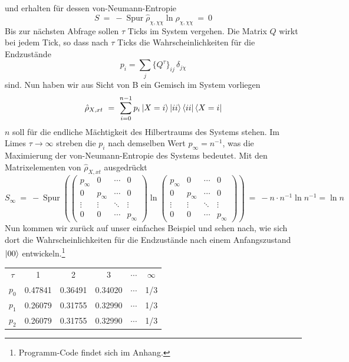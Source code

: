 \documentclass[12pt]{article}
\begin{document}
und erhalten für dessen von-Neumann-Entropie
\begin{equation}
S\ =\ -\operatorname{Spur} \hat{\rho}_{\chi,\chi\chi} \ln \hat{\rho}_{\chi,\chi\chi}\ = \ 0
\end{equation}
Bis zur nächsten Abfrage sollen $\tau$ Ticks im System vergehen. Die Matrix $Q$ wirkt bei jedem Tick, so dass nach $\tau$ Ticks die Wahrscheinlichkeiten für die Endzustände
\begin{equation}
p_i=\sum_j \{Q^\tau\}_{ij}\, \delta_{j\chi}
\end{equation}
sind. Nun haben wir aus Sicht von B ein Gemisch im System vorliegen
\begin{equation}
\hat{\rho}_{X,xt}\ = \ \sum_{i=0}^{n-1} p_i \ket{X=i}\ket{ii} \bra{ii}\bra{X=i} 
\end{equation}
$n$ soll für die endliche Mächtigkeit des Hilbertraums des Systems stehen. Im Limes $\tau\rightarrow\infty$ streben die $p_i$ nach demselben Wert $p_\infty=n^{-1}$, was die Maximierung der von-Neumann-Entropie des Systems bedeutet. Mit den Matrixelementen von $\hat{\rho}_{X,xt}$ ausgedrückt
\begin{equation}
S_\infty\ =\ -\operatorname{Spur} \left(
\begin{pmatrix}
p_\infty&0&\cdots &0\\
0&p_\infty&\cdots &0\\
\vdots &\vdots &\ddots &\vdots \\
0&0&\cdots &p_\infty
\end{pmatrix}
\ln
\begin{pmatrix}
p_\infty&0&\cdots &0\\
0&p_\infty&\cdots &0\\
\vdots &\vdots &\ddots &\vdots \\
0&0&\cdots &p_\infty
\end{pmatrix} \right)
\ =\ - n \cdot n^{-1} \ln{n^{-1}} = \ln{n}
\end{equation}
Nun kommen wir zurück auf unser einfaches Beispiel und sehen nach, wie sich dort die Wahrscheinlichkeiten für die Endzustände nach einem Anfangszustand $\ket{00}$ entwickeln.\footnote{Programm-Code findet sich im Anhang.}
\begin{center}
\begin{tabular}{ |c|c|c|c|c|c| } 
 \hline
 $\tau$ & 1 & 2 & 3 & $\cdots$ & $\infty$ \\ 
 $p_0$ & 0.47841 & 0.36491 & 0.34020 & $\cdots$ & 1/3 \\
 $p_1$ & 0.26079 & 0.31755 & 0.32990 & $\cdots$ & 1/3 \\
 $p_2$ & 0.26079 & 0.31755 & 0.32990 & $\cdots$ & 1/3 \\
 \hline
\end{tabular}
\end{center}
\end{document}
